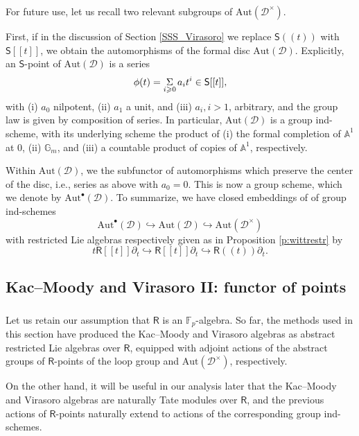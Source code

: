 \documentclass{amsart}
\theoremstyle{definition}
\newcommand{\sss}{\subsubsection{}}
\newcommand{\D}{\sD}
\newcommand{\sD}{\mathscr{D}}
\newcommand{\Sing}{\mathsf{S}}
\newcommand{\on}{\mathrm}
\newcommand{\Ring}{\mathsf{R}}
\newcommand{\F}{\mathbb{F}}
\newcommand{\pD}{\sD^\times}
\newcommand{\Aut}{\on{Aut}}
\numberwithin{equation}{section}
\begin{document}
{ \sss{} \label{sss:autd} For future use, let us recall two relevant subgroups of $\Aut(\pD)$. 

First, if in the discussion of Section \ref{SSS_Virasoro} we replace $\Sing(\!(t)\!)$ with $\Sing[[t]]$, we obtain the automorphisms of the formal disc $\Aut(\sD)$. Explicitly, an $\Sing$-point of $\Aut(\sD)$ is a series 
$$\phi(t) = \underset{i \geqslant 0} \Sigma \hspace{.5mm} a_it^i \in \Sing[[t]],$$
with (i) $a_0$ nilpotent, (ii) $a_1$ a unit, and (iii) $a_i, i > 1$, arbitrary, and the group law is given by composition of series. In particular, $\Aut(\D)$ is a group ind-scheme, with its underlying scheme the product of (i) the formal completion of $\mathbb{A}^1$ at 0, (ii) $\mathbb{G}_m$, and (iii) a countable product of copies of $\mathbb{A}^1$, respectively. 

Within $\Aut(\sD)$, we the subfunctor of automorphisms which preserve the center of the disc, i.e., series as above with $a_0 = 0$. This is now a group scheme, which we denote by $\Aut^\bullet(\sD)$. To summarize, we have closed embeddings of of group ind-schemes
$$\Aut^\bullet(\sD) \hookrightarrow \Aut(\sD) \hookrightarrow \Aut(\pD)$$
with restricted Lie algebras respectively given as in Proposition \ref{p:wittrestr} by 
$$t\Ring[[t]]\partial_t \hookrightarrow \Ring[[t]]\partial_t \hookrightarrow \Ring(\!(t)\!)\partial_t. $$}







\subsection{Kac--Moody and Virasoro II: functor of points}
\label{s:kmspace}

\sss Let us retain our assumption that $\Ring$ is an $\F_p$-algebra. So far, the methods used in this section have produced the Kac--Moody and Virasoro algebras as abstract restricted Lie algebras over $\Ring$, equipped with adjoint actions of the abstract groups of $\Ring$-points of the loop group and $\on{Aut}(\D^\times)$, respectively. 

On the other hand, it will be useful in our analysis later that the Kac--Moody and Virasoro algebras are naturally Tate modules over $\Ring$, and the previous actions of $\Ring$-points naturally extend to actions of the corresponding group ind-schemes. 
\end{document}
